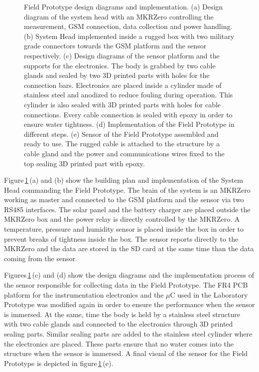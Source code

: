 \documentclass[journal,twoside,web]{ieeecolor}
\begin{document}
\begin{figure}[!t]
\caption{Field Prototype design diagrams and implementation. (a) Design diagram of the system head with an MKRZero controlling the measurement, GSM connection, data collection and power handling. (b) System Head implemented inside a rugged box with two military grade connectors towards the GSM platform and the sensor respectively. (c) Design diagrams of the sensor platform and the supports for the electronics. The body is grabbed by two cable glands and sealed by two 3D printed parts with holes for the connection bars. Electronics are placed inside a cylinder made of stainless steel and anodized to reduce fouling during operation. This cylinder is also sealed with 3D printed parts with holes for cable connections. Every cable connection is sealed with epoxy in order to ensure water tightness. (d) Implementation of the Field Prototype in different steps. (e) Sensor of the Field Prototype assembled and ready to use. The rugged cable is attached to the structure by a cable gland and the power and communications wires fixed to the top sealing 3D printed part with epoxy.}
\label{fig:measSet_3}
\end{figure}

Figure\,\ref{fig:measSet_3}\,(a) and (b) show the building plan and implementation of the System Head commanding the Field Prototype. The brain of the system is an MKRZero working as master and connected to the GSM platform and the sensor via two RS485 interfaces. The solar panel and the battery charger are placed outside the MKRZero box and the power relay is directly controlled by the MKRZero. A temperature, pressure and humidity sensor is placed inside the box in order to prevent breaks of tightness inside the box. The sensor reports directly to the MKRZero and the data are stored in the SD card at the same time than the data coming from the sensor.

Figures\,\ref{fig:measSet_3}\,(c) and (d) show the design diagrams and the implementation process of the sensor responsible for collecting data in the Field Prototype. The FR4 PCB platform for the instrumentation electronics and the $\mu$C used in the Laboratory Prototype was modified again in order to ensure the performance when the sensor is immersed. At the same, time the body is held by a stainless steel structure with two cable glands and connected to the electronics through 3D printed sealing parts. Similar sealing parts are added to the stainless steel cylinder where the electronics are placed. These parts ensure that no water comes into the structure when the sensor is immersed. A final visual of the sensor for the Field Prototype is depicted in figure\,\ref{fig:measSet_3}\,(e).
\end{document}
